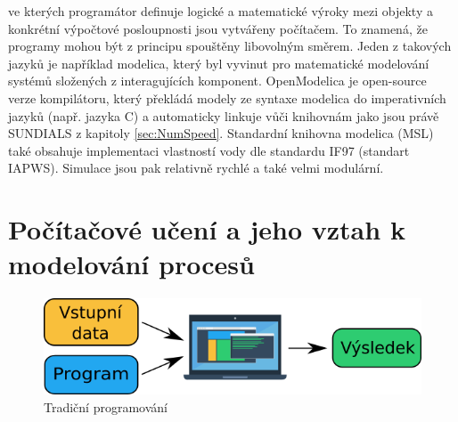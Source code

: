 ve kterých programátor definuje logické a matematické výroky mezi objekty a
konkrétní výpočtové posloupnosti jsou vytvářeny počítačem. To znamená, že
programy mohou být z principu spouštěny libovolným směrem. Jeden z takových jazyků je například
modelica, který byl vyvinut pro matematické modelování systémů složených z
interagujících komponent. OpenModelica  je open-source verze
kompilátoru, který překládá modely ze syntaxe modelica do imperativních jazyků
(např. jazyka C) a automaticky linkuje vůči knihovnám jako jsou právě SUNDIALS
z kapitoly \ref{sec:NumSpeed}. Standardní knihovna modelica (MSL) také obsahuje
implementaci vlastností vody dle standardu IF97 (standart IAPWS). Simulace jsou
pak relativně rychlé a také velmi modulární.

\section{Počítačové učení a jeho vztah k modelování procesů}
\label{sec:ML}
\begin{figure}[h] \centering \capstart
  \includegraphics[scale=0.6]{figures/traditional_prog_cz}
  \caption{Tradiční programování}
  \label{fig:traditional_prog}
\end{figure}

